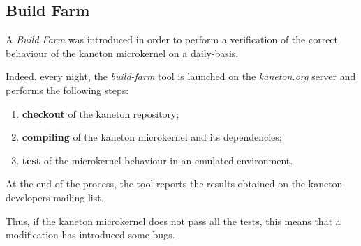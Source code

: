 %
%
%
%
%
%

%
%

\subsection{Build Farm}
\label{section:build farm}

A \textit{Build Farm} was introduced in order to perform a verification
of the correct behaviour of the kaneton microkernel on a daily-basis.

Indeed, every night, the \textit{build-farm} tool is launched on the
\textit{kaneton.org} server and performs the following steps:

\begin{enumerate}
  \item
    \textbf{checkout} of the kaneton repository;
  \item
    \textbf{compiling} of the kaneton microkernel and its dependencies;
  \item
    \textbf{test} of the microkernel behaviour in an emulated environment.
\end{enumerate}

At the end of the process, the tool reports the results obtained on
the kaneton developers mailing-list.

Thus, if the kaneton microkernel does not pass all the tests, this means
that a modification has introduced some bugs.
